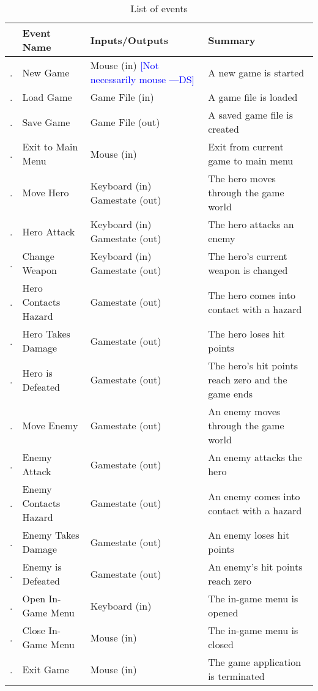 \documentclass[12pt, titlepage]{article}
\newcounter{EventList}
\newcommand{\printEvent}{
    \stepcounter{EventList}
    \arabic{EventList}.
}
\newcommand{\authornote}[3]{\textcolor{#1}{[#3 ---#2]}}
\newcommand{\authornote}[3]{}
\newcommand{\ds}[1]{\authornote{blue}{DS}{#1}}
\begin{document}
\begin{table}
\caption{List of events} \label{tab:events}
\begin{tabularx}{\textwidth}{p{0.5cm}>{\raggedright}p{3cm}>{\raggedright}p{3.5cm}>{\raggedright\arraybackslash}X}
\toprule & {\bf Event Name} & {\bf Inputs/Outputs} & {\bf Summary}\\
\midrule
\printEvent & New Game & Mouse (in) \ds{Not necessarily mouse} & A new game is started\\
\printEvent & Load Game & Game File (in) & A game file is loaded\\
\printEvent & Save Game & Game File (out) & A saved game file is created\\
\printEvent & Exit to Main Menu & Mouse (in) & Exit from current game to main menu\\
\printEvent & Move Hero & Keyboard (in) Gamestate (out) & The hero moves through the game world\\
\printEvent & Hero Attack & Keyboard (in) Gamestate (out) & The hero attacks an enemy\\
\printEvent & Change Weapon & Keyboard (in) Gamestate (out) & The hero's current weapon is changed\\
\printEvent & Hero Contacts Hazard & Gamestate (out) & The hero comes into contact with a hazard\\
\printEvent & Hero Takes Damage & Gamestate (out) & The hero loses hit points\\
\printEvent & Hero is Defeated & Gamestate (out) & The hero's hit points reach zero and the game ends\\
\printEvent & Move Enemy & Gamestate (out) & An enemy moves through the game world\\
\printEvent & Enemy Attack & Gamestate (out) & An enemy attacks the hero\\
\printEvent & Enemy Contacts Hazard & Gamestate (out)  & An enemy comes into contact with a hazard\\
\printEvent & Enemy Takes Damage & Gamestate (out) & An enemy loses hit points\\
\printEvent & Enemy is Defeated & Gamestate (out) & An enemy's hit points reach zero\\
\printEvent & Open In-Game Menu & Keyboard (in) & The in-game menu is opened\\
\printEvent & Close In-Game Menu & Mouse (in) & The in-game menu is closed\\
\printEvent & Exit Game & Mouse (in) & The game application is terminated\\
\bottomrule 
\end{tabularx}
\end{table}
\end{document}
